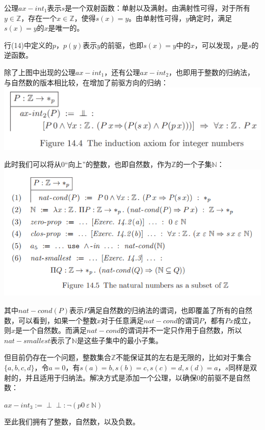\documentclass[UTF8]{article}
\newcommand{\dperp}{\perp\!\!\!\perp}
\begin{document}
		公理$ax{-}int_1$表示$s$是一个双射函数：单射以及满射。由满射性可得，对于所有$y\in\mathbb{Z}$，存在一个$x\in\mathbb{Z}$，使得$s(x)=y$。由单射性可得，$y$确定时，满足$s(x)=y$的$x$是唯一的。
		
		行(14)中定义的$p$，$p(y)$表示$y$的前驱，也即$s(x)=y$中的$x$，可以发现，$p$是$s$的逆函数。
		
		除了上图中出现的公理$ax{-}int_1$，还有公理$ax{-}int_2$，也即用于整数的归纳法，与自然数的版本相比较，在增加了前驱方向的归纳：\\
		\includegraphics[width=0.93\linewidth]{"../imgs/14-2.png"}
		
		此时我们可以将从0“向上”的整数，也即自然数，作为$\mathbb{Z}$的一个子集$\mathbb{N}$：\\
		\includegraphics[width=0.93\linewidth]{"../imgs/14-3.png"}
		
		其中$nat{-}cond(P)$表示$P$满足自然数的归纳法的谓词，也即覆盖了所有的自然数，可以看到，如果一个整数$x$对于任意满足$nat{-}cond$的谓词$P$，都有$Px$成立，则$x$是一个自然数。而满足$nat{-}cond$的谓词并不一定只作用于自然数，所以$nat{-}smallest$表示了$\mathbb{N}$是这些子集中的最小子集。
		
		但目前仍存在一个问题，整数集合$\mathbb{Z}$不能保证其的左右是无限的，比如对于集合$\{a,b,c,d\}$，令$a=0$，有$s(a)=b,s(b)=c,s(c)=d,s(d)=a$，$s$同样是双射的，并且适用于归纳法。解决方式是添加一个公理，以确保0的前驱不是自然数：
		
		$ax{-}int_3:=\dperp:\neg(p0\ \varepsilon\ \mathbb{N})$
		
		至此我们拥有了整数，自然数，以及负数。
\end{document}
